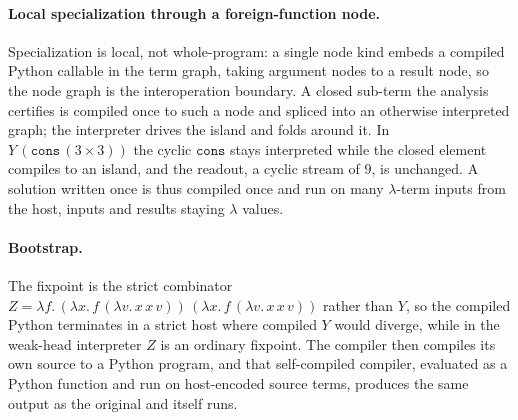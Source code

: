 \paragraph{Local specialization through a foreign-function node.}
Specialization is local, not whole-program: a single node kind embeds a compiled Python callable in
the term graph, taking argument nodes to a result node, so the node graph is the interoperation
boundary. A closed sub-term the analysis certifies is compiled once to such a node and spliced into an
otherwise interpreted graph; the interpreter drives the island and folds around it. In
$Y\,(\mathtt{cons}\,(3 \times 3))$ the cyclic $\mathtt{cons}$ stays interpreted while the closed
element compiles to an island, and the readout, a cyclic stream of $9$, is unchanged. A solution
written once is thus compiled once and run on many $\lambda$-term inputs from the host, inputs and
results staying $\lambda$ values.

\paragraph{Bootstrap.}
The fixpoint is the strict combinator
$Z = \lambda f.\,(\lambda x.\,f\,(\lambda v.\,x\,x\,v))\,(\lambda x.\,f\,(\lambda v.\,x\,x\,v))$
rather than $Y$, so the compiled Python terminates in a strict host where compiled $Y$ would
diverge, while in the weak-head interpreter $Z$ is an ordinary fixpoint. The compiler then compiles
its own source to a Python program, and that self-compiled compiler, evaluated as a Python function
and run on host-encoded source terms, produces the same output as the original and itself runs.

